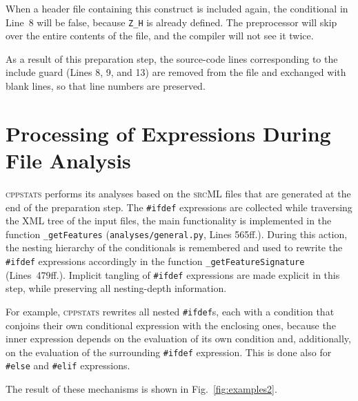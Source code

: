 \documentclass[a4paper]{scrartcl}
\newcommand\code[1]{\texttt{#1}}
\newcommand\feature[1]{\texttt{#1}}
\newcommand\tool[1]{\textsc{#1}}
\newcommand\ifdeff[1]{\code{\##1}\xspace}
\newcommand\ifdef[0]{{\upshape\ifdeff{ifdef}}\xspace}
\newcommand\ifdefs[0]{\ifdef{}s\xspace}
\newcommand\cppstats[0]{\tool{cppstats}\xspace}
\begin{document}
When a header file containing this construct is included again, the conditional in Line~8 will be false, because \feature{Z\_H} is already defined.
The preprocessor will skip over the entire contents of the file, and the compiler will not see it twice.

As a result of this preparation step, the source-code lines corresponding to the include guard (Lines 8, 9, and 13) are removed from the file and exchanged with blank lines, so that line numbers are preserved.



\section{Processing of Expressions During File Analysis}
\label{sec:processing}

\cppstats performs its analyses based on the \tool{srcML} files that are generated at the end of the preparation step.
The \ifdef expressions are collected while traversing the \tool{XML} tree of the input files, the main functionality is implemented in the function \code{\_getFeatures} (\code{analyses/general.py}, Lines 565ff.).
During this action, the nesting hierarchy of the conditionals is remembered and used to rewrite the \ifdef expressions accordingly in the function \code{\_getFeatureSignature} (Lines~479ff.).
Implicit tangling of \ifdef expressions are made explicit in this step, while preserving all nesting-depth information.

For example, \cppstats rewrites all nested \ifdefs, each with a condition that conjoins their own conditional expression with the enclosing ones, because the inner expression depends on the evaluation of its own condition and, additionally, on the evaluation of the surrounding \ifdef expression.
This is done also for \ifdeff{else} and \ifdeff{elif} expressions.
 
The result of these mechanisms is shown in Fig.\ \ref{fig:examples2}.
\end{document}

